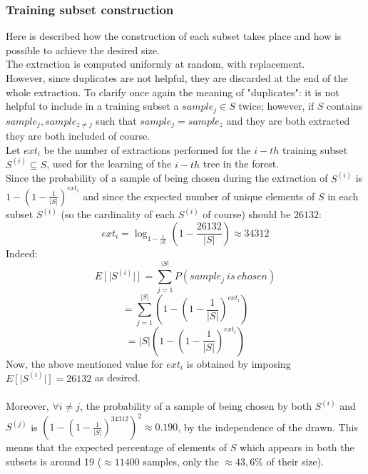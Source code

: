 \documentclass[12pt]{article}
\begin{document}
\subsubsection{Training subset construction}
Here is described how the construction of each subset takes place and how is possible to achieve the desired size.\\
The extraction is computed uniformly at random, with replacement.\\ However, since duplicates are not helpful, they are discarded at the end of the whole extraction. To clarify once again the meaning of "duplicates": it is not helpful to include in a training subset a $sample_j \in S$ twice; however, if $S$ contains $sample_j, sample_{z \neq j}$ such that $sample_j = sample_z$ and they are both extracted they are both included of course.\\ Let $ext_i$ be the number of extractions performed for the $i-th$ training subset\\ $S^{(i)} \subseteq S$, used for the learning of the $i-th$ tree in the forest.\\
Since the probability of a sample of being chosen during the extraction of $S^{(i)}$ is $1 - \left(1 - \frac{1}{|S|}\right)^{ext_i}$ and since the expected number of unique elements of $S$ in each subset $S^{(i)}$ (so the cardinality of each $S^{(i)}$ of course) should be $26132$: 
$$ext_i = \log_{1 - \frac{1}{|S|}}\left(1 - \frac{26132}{|S|}\right) \approx 34312$$
Indeed:
$$E\left[\right|S^{(i)}\left|\right] = \sum_{j = 1}^{|S|} P\left(sample_j\ is\ chosen\right)$$
$$= \sum_{j = 1}^{|S|} \left(1 - \left(1 - \frac{1}{|S|}\right)^{ext_i}\right)$$
$$= \left| S \right|\left(1 - \left(1 - \frac{1}{|S|}\right)^{ext_i}\right)$$
Now, the above mentioned value for $ext_i$ is obtained by imposing\\ $E\left[\right|S^{(i)}\left|\right] = 26132$ as desired.\\\\
Moreover, $\forall i \neq j$, the probability of a sample of being chosen by both $S^{(i)}$ and $S^{(j)}$ is $\left( 1 - \left( 1 - \frac{1}{|S|} \right)^{34312} \right)^2 \approx 0.190$, by the independence of the drawn. This means that the expected percentage of elements of $S$ which appears in both the subsets is around 19 ($\approx 11400$ samples, only the $\approx 43,6\%$ of their size).
\newpage
\end{document}
